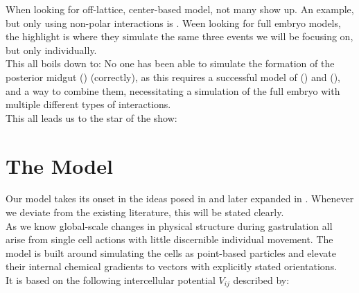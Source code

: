 When looking for off-lattice, center-based model, not many show up. An example, but only using non-polar interactions is . Ween looking for full embryo models, the highlight is  where they simulate the same three events we will be focusing on, but only individually.\\

This all boils down to: No one has been able to simulate the formation of the posterior midgut () (correctly), as this requires a successful model of () and (), and a way to combine them, necessitating a simulation of the full embryo with multiple different types of interactions.\\



% 










This all leads us to the star of the show:

\section{The Model}

Our model takes its onset in the ideas posed in  and later expanded in . Whenever we deviate from the existing literature, this will be stated clearly.\\

As we know global-scale changes in physical structure during gastrulation all arise from single cell actions with little discernible individual movement. The model is built around simulating the cells as point-based particles and elevate their internal chemical gradients to vectors with explicitly stated orientations. \\
It is based on the following intercellular potential $V_{ij}$ described by: 

